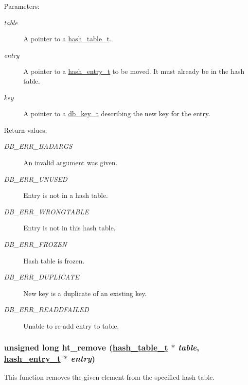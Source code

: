 \begin{Desc}
\item[Parameters:]
\begin{description}
\item[{\em table}]A pointer to a \hyperlink{group__dbprim__hash_a0}{hash\_\-table\_\-t}. \item[{\em entry}]A pointer to a \hyperlink{group__dbprim__hash_a1}{hash\_\-entry\_\-t} to be moved. It must already be in the hash table. \item[{\em key}]A pointer to a \hyperlink{group__dbprim_a0}{db\_\-key\_\-t} describing the new key for the entry.\end{description}
\end{Desc}
\begin{Desc}
\item[Return values:]
\begin{description}
\item[{\em DB\_\-ERR\_\-BADARGS}]An invalid argument was given. \item[{\em DB\_\-ERR\_\-UNUSED}]Entry is not in a hash table. \item[{\em DB\_\-ERR\_\-WRONGTABLE}]Entry is not in this hash table. \item[{\em DB\_\-ERR\_\-FROZEN}]Hash table is frozen. \item[{\em DB\_\-ERR\_\-DUPLICATE}]New key is a duplicate of an existing key. \item[{\em DB\_\-ERR\_\-READDFAILED}]Unable to re-add entry to table. \end{description}
\end{Desc}
\hypertarget{group__dbprim__hash_a9}{
\subsubsection[ht\_\-remove]{\setlength{\rightskip}{0pt plus 5cm}unsigned long ht\_\-remove (\hyperlink{dbprim_8h_a0}{hash\_\-table\_\-t} $\ast$ {\em table}, \hyperlink{dbprim_8h_a1}{hash\_\-entry\_\-t} $\ast$ {\em entry})}}
\label{group__dbprim__hash_a9}


This function removes the given element from the specified hash table.

